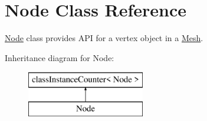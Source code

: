 \hypertarget{class_node}{}\section{Node Class Reference}
\label{class_node}


\mbox{\hyperlink{class_node}{Node}} class provides A\+PI for a vertex object in a \mbox{\hyperlink{class_mesh}{Mesh}}.  


Inheritance diagram for Node\+:\begin{figure}[H]
\begin{center}
\leavevmode
\includegraphics[height=2.000000cm]{class_node}
\end{center}
\end{figure}
